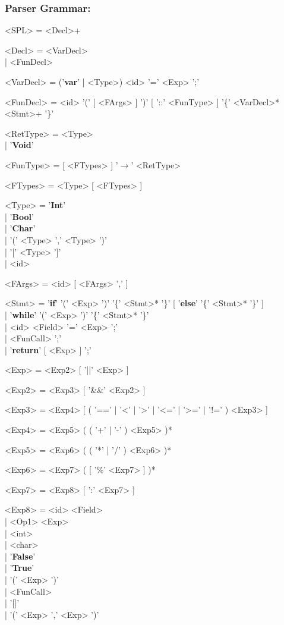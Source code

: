 \documentclass{article}
\begin{document}
\subsubsection*{Parser Grammar:}
\begin{grammar}
	<SPL> = <Decl>+

	<Decl> = <VarDecl> \\| <FunDecl>

	<VarDecl> = ('\textbf{var}' | <Type>) <id> '=' <Exp> ';'

	<FunDecl> = <id> '(' [ <FArgs> ] ')' [ '::' <FunType> ] '\{' <VarDecl>* <Stmt>+ '\}'

	<RetType> = <Type> \\| '\textbf{Void}'

	<FunType> = [ <FTypes> ] '$\rightarrow$' <RetType>

	<FTypes> = <Type> [ <FTypes> ]

	<Type> = '\textbf{Int}' \\| '\textbf{Bool}' \\| '\textbf{Char}' \\| '(' <Type> ',' <Type> ')' \\| '[' <Type> ']' \\| <id>

	<FArgs> = <id> [ <FArgs> ',' ]

	<Stmt> = '\textbf{if}' '(' <Exp> ')' '\{' <Stmt>* '\}' [ '\textbf{else}' '\{' <Stmt>* '\}' ] \\| '\textbf{while}' '(' <Exp> ')' '\{' <Stmt>* '\}' \\| <id> <Field> '=' <Exp> ';' \\| <FunCall> ';' \\| '\textbf{return}' [ <Exp> ] ';'

	<Exp> = <Exp2> [ '||' <Exp> ]

	<Exp2> = <Exp3> [ '\&\&' <Exp2> ]

	<Exp3> = <Exp4> [ ( '==' | '\textless' | '\textgreater' | '\textless=' | '\textgreater=' | '!=' ) <Exp3> ]

	<Exp4> = <Exp5> ( ( '+' | '-' ) <Exp5> )*

	<Exp5> = <Exp6> ( ( '*' | '/' ) <Exp6> )*

	<Exp6> = <Exp7> ( [ '\%' <Exp7> ] )*

	<Exp7> = <Exp8> [ ':' <Exp7> ]

	<Exp8> = <id> <Field> \\| <Op1> <Exp> \\| <int> \\| <char> \\| '\textbf{False}' \\| '\textbf{True}' \\| '(' <Exp> ')' \\| <FunCall> \\| '[]' \\| '(' <Exp> ',' <Exp> ')'


\end{grammar}
\end{document}
